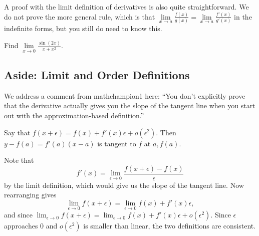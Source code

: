 \documentclass[blue,onecol]{shooting}
\begin{document}
A proof with the limit definition of derivatives is also quite straightforward. We do not prove the more general rule, which is that $\lim\limits_{x\to a}\frac{f(x)}{g(x)}=\lim\limits_{x\to a}\frac{f'(x)}{g'(x)}$ in the indefinite forms, but you still do need to know this.

\begin{exer}
Find $\lim\limits_{x\to 0}\frac{\sin(2x)}{x+x^2}.$
\end{exer}

\subsection{Aside: Limit and Order Definitions}
We address a comment from mathchampion1 here: ``You don't explicitly prove that the derivative actually gives you the slope of the tangent line when you start out with the approximation-based definition.''

\begin{theo}
Say that $f(x+\epsilon)=f(x)+f'(x)\epsilon+o(\epsilon^2).$ Then $y-f(a)=f'(a)(x-a)$ is tangent to $f$ at $a,f(a).$
\end{theo}

\begin{pro}
Note that \[f'(x)=\lim_{\epsilon\to 0}\frac{f(x+\epsilon)-f(x)}{\epsilon}\] by the limit definition, which would give us the slope of the tangent line. Now rearranging gives
\[\lim_{\epsilon\to 0}f(x+\epsilon)=\lim_{\epsilon\to 0}f(x)+f'(x)\epsilon,\]
and since $\lim_{\epsilon\to 0}f(x+\epsilon)=\lim_{\epsilon\to 0}f(x)+f'(x)\epsilon+o(\epsilon^2).$ Since $\epsilon$ approaches $0$ and $o(\epsilon^2)$ is smaller than linear, the two definitions are consistent.
\end{pro}
\end{document}
